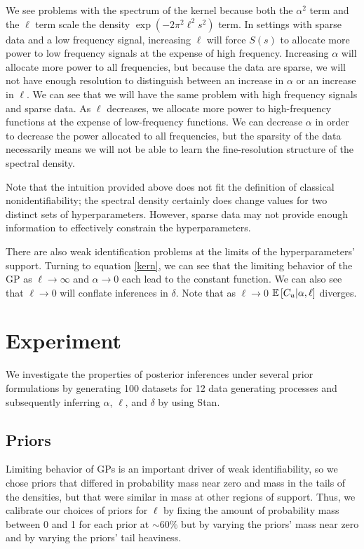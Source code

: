 \documentclass{article}
\newcommand{\Exp}[1]{\ensuremath{\mathbb{E} \lb #1 \rb}}
\newcommand{\lb}{\ensuremath{\left[}}
\newcommand{\rb}{\ensuremath{\right]}}
\begin{document}
We see problems with the spectrum of the kernel because both the $\alpha ^ 2$
term and the $\ell$ term scale the density $\exp \left(- 2 \pi^2 \ell^2 s^2
\right)$ term. In settings with sparse data and a low frequency signal,
increasing $\ell$ will force $S(s)$ to allocate more power to low frequency
signals at the expense of high frequency. Increasing $\alpha$ will allocate
more power to all frequencies, but because the data are sparse, we will not
have enough resolution to distinguish between an increase in $\alpha$ or an
increase in $\ell$. We can see that we will have the same problem with high
frequency signals and sparse data. As $\ell$ decreases, we allocate more power
to high-frequency functions at the expense of low-frequency functions. We can
decrease $\alpha$ in order to decrease the power allocated to all frequencies,
but the sparsity of the data necessarily means we will not be able to learn the
fine-resolution structure of the spectral density.

Note that the intuition provided above does not fit the definition of 
classical nonidentifiability; the spectral density certainly does change
values for two distinct sets of hyperparameters. However, sparse data
may not provide enough information to effectively constrain the hyperparameters.

There are also weak identification problems at the limits of the
hyperparameters' support. Turning to equation \ref{kern}, we can see that
the limiting behavior of the GP as $\ell \rightarrow \infty$ and $\alpha
\rightarrow 0$ each lead to the constant function. We can also see that $\ell
\rightarrow 0$ will conflate inferences in $\delta$.  Note that as $\ell
\rightarrow 0$ $\Exp{C_u | \alpha, \ell}$ diverges.

\section{Experiment} \label{experiment}

We investigate the properties of posterior inferences under several prior
formulations by generating 100 datasets for 12 data generating processes and
subsequently inferring $\alpha$, $\ell$, and $\delta$ by using Stan.

\subsection{Priors}

Limiting behavior of GPs is an important driver of weak identifiability, so we
chose priors that differed in probability mass near zero and mass
in the tails of the densities, but that were similar in mass at other regions
of support. Thus, we calibrate our choices of priors for $\ell$ by fixing the
amount of probability mass between 0 and 1 for each prior at $\sim60\%$ but by
varying the priors' mass near zero and by varying the priors' tail heaviness.
\end{document}

